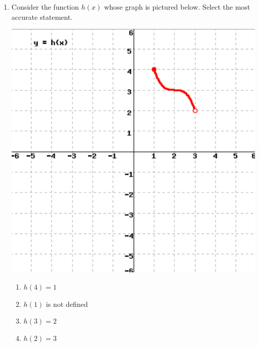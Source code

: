 \documentclass{article}
\begin{document}
\begin{enumerate}
\begin{enumerate}[label=\Alph*)]
                  \end{enumerate}


    \item Consider the function $h(x)$ whose graph is pictured below. Select the most accurate statement.
              \begin{multicols}{2}
              \includegraphics[keepaspectratio=True, width=0.6\linewidth]{images/eval-dom-rng.png}

              \begin{enumerate}[label=\Alph*)]
                   \item $h(4) = 1$
                   \item $h(1)$ is not defined 
                   \item $h(3) = 2$
                   \item $h(2) = 3$%
              \end{enumerate}
              \end{multicols}


\end{enumerate}
\end{document}
